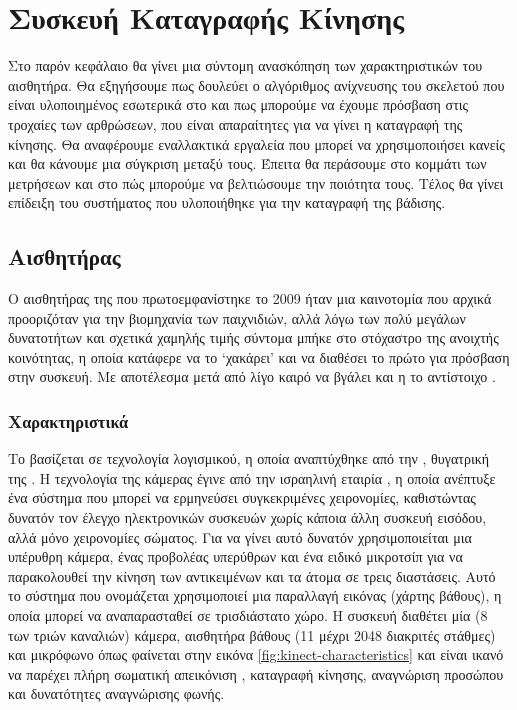 \chapter{Συσκευή Καταγραφής Κίνησης}

Στο παρόν κεφάλαιο θα γίνει μια σύντομη ανασκόπηση των χαρακτηριστικών του αισθητήρα. Θα εξηγήσουμε πως δουλεύει ο αλγόριθμος ανίχνευσης του σκελετού που είναι υλοποιημένος εσωτερικά στο  και πως μπορούμε να έχουμε πρόσβαση στις τροχαίες των αρθρώσεων, που είναι απαραίτητες για να γίνει η καταγραφή της κίνησης. Θα αναφέρουμε εναλλακτικά εργαλεία που μπορεί να χρησιμοποιήσει κανείς και θα κάνουμε μια σύγκριση μεταξύ τους. Έπειτα θα περάσουμε στο κομμάτι των μετρήσεων και στο πώς μπορούμε να βελτιώσουμε την ποιότητα τους. Τέλος θα γίνει επίδειξη του συστήματος που υλοποιήθηκε για την καταγραφή της βάδισης.

\section{Αισθητήρας}

Ο αισθητήρας της  που πρωτοεμφανίστηκε το 2009 ήταν μια καινοτομία που αρχικά προοριζόταν για την βιομηχανία των παιχνιδιών, αλλά λόγω των πολύ μεγάλων δυνατοτήτων και σχετικά χαμηλής τιμής σύντομα μπήκε στο στόχαστρο της ανοιχτής κοινότητας, η οποία κατάφερε να το \lq χακάρει\rq \; και να διαθέσει το πρώτο  για πρόσβαση στην συσκευή. Με αποτέλεσμα μετά από λίγο καιρό να βγάλει και η  το αντίστοιχο .

\subsection{Χαρακτηριστικά}

Το  βασίζεται σε τεχνολογία λογισμικού, η οποία αναπτύχθηκε από την , θυγατρική της . Η τεχνολογία της κάμερας έγινε από την ισραηλινή εταιρία , η οποία ανέπτυξε ένα σύστημα που μπορεί να ερμηνεύσει συγκεκριμένες χειρονομίες, καθιστώντας δυνατόν τον έλεγχο ηλεκτρονικών συσκευών χωρίς κάποια άλλη συσκευή εισόδου, αλλά μόνο χειρονομίες σώματος. Για να γίνει αυτό δυνατόν χρησιμοποιείται μια υπέρυθρη κάμερα, ένας προβολέας υπερύθρων και ένα ειδικό μικροτσίπ για να παρακολουθεί την κίνηση των αντικειμένων και τα άτομα σε τρεις διαστάσεις. Αυτό το σύστημα  που ονομάζεται  χρησιμοποιεί μια παραλλαγή εικόνας (χάρτης βάθους), η οποία μπορεί να αναπαρασταθεί σε τρισδιάστατο χώρο. Η συσκευή διαθέτει μία  (8\- των τριών καναλιών) κάμερα, αισθητήρα βάθους (11\- μέχρι 2048 διακριτές στάθμες) και  μικρόφωνο όπως φαίνεται στην εικόνα \ref{fig:kinect-characteristics} και είναι ικανό να παρέχει πλήρη σωματική απεικόνιση , καταγραφή κίνησης, αναγνώριση προσώπου και δυνατότητες αναγνώρισης φωνής.

